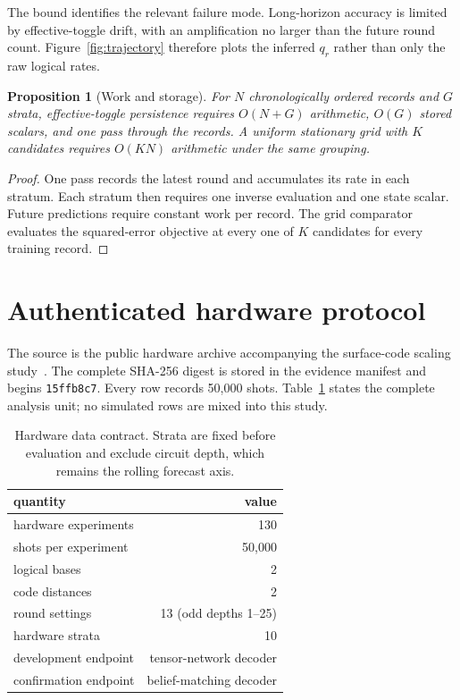\documentclass[10pt,letterpaper,twoside]{article}
\newtheorem{proposition}{Proposition}
\begin{document}
The bound identifies the relevant failure mode. Long-horizon accuracy is
limited by effective-toggle drift, with an amplification no larger than the
future round count. Figure~\ref{fig:trajectory} therefore plots the inferred
$q_r$ rather than only the raw logical rates.

\begin{proposition}[Work and storage]
\label{prop:complexity}
For $N$ chronologically ordered records and $G$ strata, effective-toggle
persistence requires $O(N+G)$ arithmetic, $O(G)$ stored scalars, and one pass
through the records. A uniform stationary grid with $K$ candidates requires
$O(KN)$ arithmetic under the same grouping.
\end{proposition}

\begin{proof}
One pass records the latest round and accumulates its rate in each stratum.
Each stratum then requires one inverse evaluation and one state scalar. Future
predictions require constant work per record. The grid comparator evaluates
the squared-error objective at every one of $K$ candidates for every training
record.
\end{proof}

\section{Authenticated hardware protocol}

The source is the public hardware archive accompanying the surface-code scaling
study~\cite{google2023suppressing}. The complete SHA-256 digest is stored in the
evidence manifest and begins \texttt{15ffb8c7}.
Every row records 50,000 shots. Table~\ref{tab:data} states the complete
analysis unit; no simulated rows are mixed into this study.

\begin{table}[H]
\centering
\caption{Hardware data contract. Strata are fixed before evaluation and
exclude circuit depth, which remains the rolling forecast axis.}
\label{tab:data}
\begin{tabular}{lr}
\toprule
quantity & value\\
\midrule
hardware experiments & 130\\
shots per experiment & 50,000\\
logical bases & 2\\
code distances & 2\\
round settings & 13 (odd depths 1--25)\\
hardware strata & 10\\
development endpoint & tensor-network decoder\\
confirmation endpoint & belief-matching decoder\\
\bottomrule
\end{tabular}
\end{table}
\end{document}

